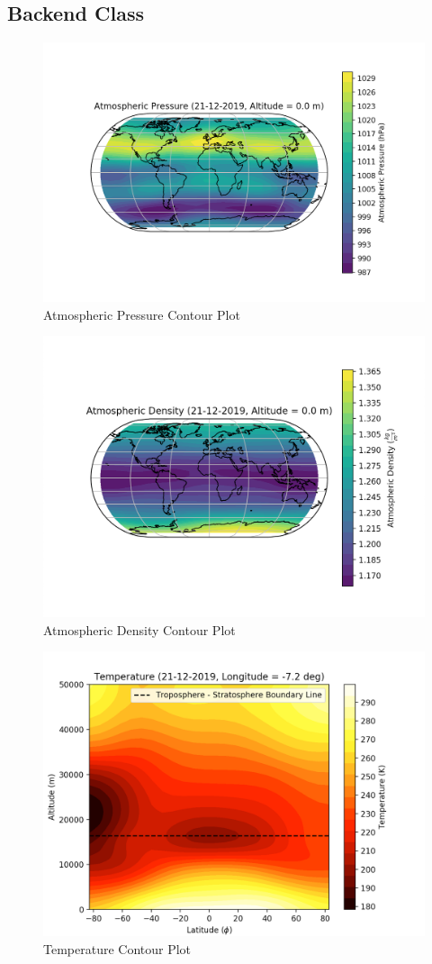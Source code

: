 \begin{appendices}
    \subsection{Backend Class}
    \begin{figure}[H]
        \centering
        \includegraphics[width=.8\linewidth]{Graphs/contour_plots/pressure.png}
        \caption{Atmospheric Pressure Contour Plot}
    \end{figure}
    
    \begin{figure}[H]
        \centering
        \includegraphics[width=.8\linewidth]{Graphs/contour_plots/density.png}
        \caption{Atmospheric Density Contour Plot}
    \end{figure}
    
    \begin{figure}[H]
        \centering
        \includegraphics[width=.8\linewidth]{Graphs/contour_plots/temperature.png}
        \caption{Temperature Contour Plot}
    \end{figure}
    

\end{appendices}
